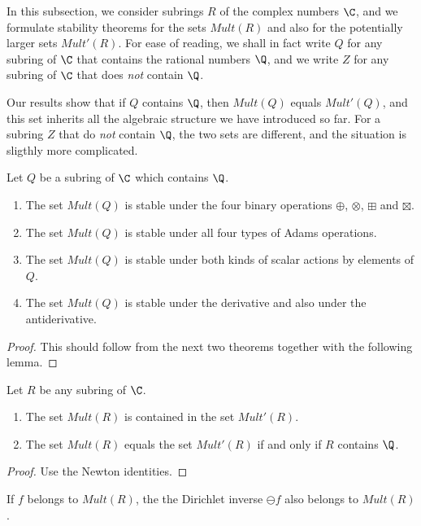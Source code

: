 In this subsection, we consider subrings $R$ of the complex numbers $\C$, and we formulate stability theorems for the sets $Mult(R)$ and also for the potentially larger sets $Mult'(R)$. For ease of reading, we shall in fact write $Q$ for any subring of $\C$ that contains the rational numbers $\Q$, and we write $Z$ for any subring of $\C$ that does \emph{not} contain $\Q$. 

Our results show that if $Q$ contains $\Q$, then $Mult(Q)$ equals $Mult'(Q)$, and this set inherits all the algebraic structure we have introduced so far. For a subring $Z$ that do \emph{not} contain $\Q$, the two sets are different, and the situation is sligthly more complicated.



\begin{theorem}
Let $Q$ be a subring of $\C$ which contains $\Q$. 
\begin{enumerate}
\item The set $Mult(Q)$ is stable under the four binary operations $\oplus$, $\otimes$, $\boxplus$ and $\boxtimes$.
\item The set $Mult(Q)$ is stable under all four types of Adams operations. 
\item The set $Mult(Q)$ is stable under both kinds of scalar actions by elements of $Q$.
\item The set $Mult(Q)$ is stable under the derivative and also under the antiderivative.
\end{enumerate}
\end{theorem}

\begin{proof}
This should follow from the next two theorems together with the following lemma. 
\end{proof}

\begin{lemma}
Let $R$ be any subring of $\C$. 
\begin{enumerate}
\item The set $Mult(R)$ is contained in the set $Mult'(R)$.
\item The set $Mult(R)$ equals the set $Mult'(R)$ if and only if $R$ contains $\Q$.
\end{enumerate}
\end{lemma}
\begin{proof}
Use the Newton identities.
\end{proof}

\begin{lemma}
If $f$ belongs to $Mult(R)$, the the Dirichlet inverse $\ominus f$ also belongs to $Mult(R)$. 
\end{lemma}




